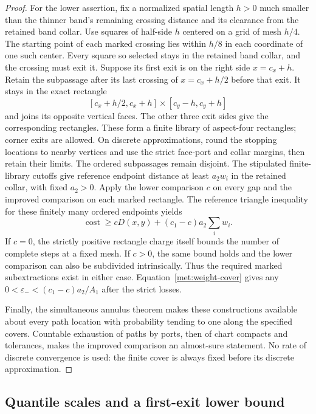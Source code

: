 \documentclass[11pt]{article}
\numberwithin{equation}{section}
\theoremstyle{definition}
\theoremstyle{remark}
\newcommand{\1}{\mathbf 1}
\begin{document}
\begin{proof}
For the lower assertion, fix a normalized spatial length $h>0$ much
smaller than the thinner band's remaining crossing distance and its
clearance from the retained band collar.  Use squares of half-side
$h$ centered on a grid of mesh $h/4$.  The starting point of each
marked crossing lies within $h/8$ in each coordinate of one such
center.  Every square so selected stays in the retained band collar,
and the crossing must exit it.  Suppose its first exit is on the
right side $x=c_x+h$.  Retain the subpassage after its last crossing
of $x=c_x+h/2$ before that exit.  It stays in the exact rectangle
\[
 [c_x+h/2,c_x+h]\times[c_y-h,c_y+h]
\]
and joins its opposite vertical faces.  The other three exit sides
give the corresponding rectangles.  These form a finite library of
aspect-four rectangles; corner exits are allowed.  On discrete
approximations, round the stopping locations to nearby vertices and
use the strict face-port and collar margins, then retain their limits.
The ordered subpassages remain disjoint.  The stipulated finite-library
cutoffs give reference endpoint distance at least $a_2w_i$ in the
retained collar, with fixed $a_2>0$.  Apply the lower comparison $c$
on every gap and the improved comparison on each marked rectangle.
The reference triangle inequality for these finitely many ordered
endpoints yields
\[
 \operatorname{cost}\geq cD(x,y)+(c_1-c)a_2\sum_iw_i.
\]
If $c=0$, the strictly positive rectangle charge itself bounds the
number of complete steps at a fixed mesh.  If $c>0$, the same bound
holds and the lower comparison can also be subdivided intrinsically.
Thus the required marked subextractions exist in either case.
Equation~\eqref{met:weight-cover} gives any
$0<\varepsilon_-<(c_1-c)a_2/A_1$ after the strict losses.

Finally, the simultaneous annulus theorem makes these constructions
available about every path location with probability tending to one
along the specified covers.  Countable exhaustion of paths by ports,
then of chart compacts and tolerances, makes the improved comparison
an almost-sure statement.  No rate of discrete convergence is used:
the finite cover is always fixed before its discrete approximation.
\end{proof}

\subsection{Quantile scales and a first-exit lower bound}
\end{document}
